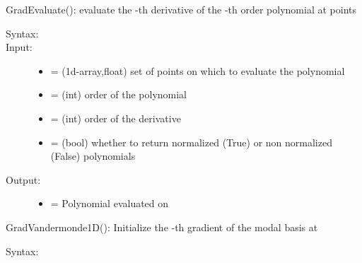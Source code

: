 \documentclass[letterpaper,10pt,english]{sphinxmanual}
\begin{document}
\begin{fulllineitems}
\begin{fulllineitems}
\end{fulllineitems}


\begin{fulllineitems}
\label{index:SpectralToolbox.Spectral1D.Poly1D.GradEvaluate}
GradEvaluate(): evaluate the -th derivative of the -th order polynomial at points 
\begin{description}
\item[{Syntax:}] \leavevmode
{}

\item[{Input:}] \leavevmode\begin{itemize}
\item {} 
 = (1d-array,float) set of points on which to evaluate the polynomial

\item {} 
 = (int) order of the polynomial

\item {} 
 = (int) order of the derivative

\item {} 
 = (bool) whether to return normalized (True) or non normalized (False) polynomials

\end{itemize}

\item[{Output:}] \leavevmode\begin{itemize}
\item {} 
 = Polynomial evaluated on 

\end{itemize}

\end{description}

\end{fulllineitems}


\begin{fulllineitems}
\label{index:SpectralToolbox.Spectral1D.Poly1D.GradVandermonde1D}
GradVandermonde1D(): Initialize the -th gradient of the modal basis  at 
\begin{description}
\item[{Syntax:}] \leavevmode
{}


\end{description}
\end{fulllineitems}
\end{fulllineitems}
\end{document}
